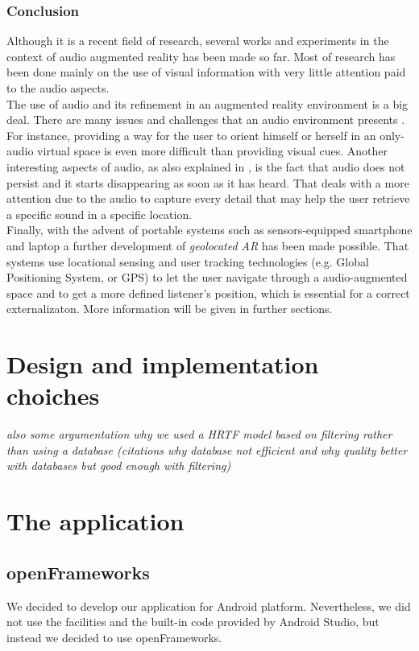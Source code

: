 \documentclass[journal]{IEEEtran}
\begin{document}
\subsubsection{Conclusion}
Although it is a recent field of research, several works and experiments in the context of audio augmented reality has been made so far. Most of research has been done mainly on the use of visual information with very little attention paid to the audio aspects.\\ 
The use of audio and its refinement in an augmented reality environment is a big deal. There are many issues and challenges that an audio environment presents \cite{}. For instance, providing a way for the user to orient himself or herself in an only-audio virtual space is even more difficult than providing visual cues. Another interesting aspects of audio, as also explained in \cite{}, is the fact that audio does not persist and it starts disappearing as soon as it has heard. That deals with a more attention due to the audio to capture every detail that may help the user retrieve a specific sound in a specific location.\\
Finally, with the advent of portable systems such as sensors-equipped smartphone and laptop a further development of \emph{geolocated AR} has been made possible. That systems use locational sensing and user tracking technologies (e.g. Global Positioning System, or GPS) to let the user navigate through a audio-augmented space and to get a more defined listener's position, which is essential for a correct externalizaton. More information will be given in further sections.

	
\section{Design and implementation choiches}	
\textit{also some argumentation why we used a HRTF model based on filtering rather than using a database (citations why database not efficient and why quality better with databases but good enough with filtering)}
\section{The application}
\subsection{openFrameworks}
We decided to develop our application for Android platform. Nevertheless, we did not use the facilities and the built-in code provided by Android Studio, but instead we decided to use openFrameworks. 
\end{document}
